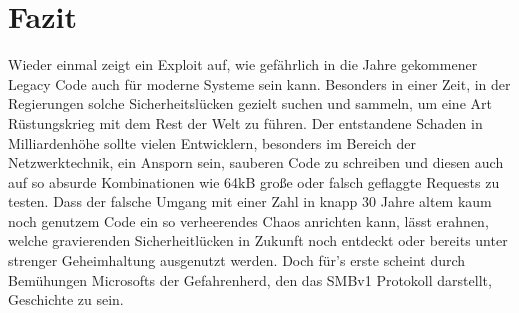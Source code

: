 \documentclass[DIV=12,headings=normal,pdftex,headinclude=false,footinclude=false,final]{scrreprt}
\begin{document}
\chapter{Fazit}
Wieder einmal zeigt ein Exploit auf, wie gefährlich in die Jahre gekommener Legacy Code auch für moderne Systeme sein kann. Besonders in einer Zeit, in der Regierungen solche Sicherheitslücken gezielt suchen und sammeln, um eine Art Rüstungskrieg mit dem Rest der Welt zu führen.
Der entstandene Schaden in Milliardenhöhe sollte vielen Entwicklern, besonders im Bereich der Netzwerktechnik, ein Ansporn sein, sauberen Code zu schreiben und diesen auch auf so absurde Kombinationen wie 64kB große oder falsch geflaggte Requests zu testen. Dass der falsche Umgang mit einer Zahl in knapp 30 Jahre altem kaum noch genutzem Code ein so verheerendes Chaos anrichten kann, lässt erahnen, welche gravierenden Sicherheitlücken in Zukunft noch entdeckt oder bereits unter strenger Geheimhaltung ausgenutzt werden. Doch für's erste scheint durch Bemühungen Microsofts der Gefahrenherd, den das SMBv1 Protokoll darstellt, Geschichte zu sein.

\clearpage
\label{sec:literatur}
\renewcommand{\bibname}{Quellenverzeichnis}


\end{document}
